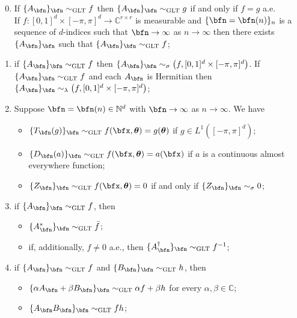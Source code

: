 \documentclass{amsart}
\newcommand{\bftheta}{{\boldsymbol\theta}}
\begin{document}
\begin{enumerate}[label=\textbf{GLT \arabic*}]
\setcounter{enumi}{-1}
\item \label{GLT0} If $\{A_\bfn\}_{\bfn} \sim_{\text{GLT}} f$ then $\{A_\bfn\}_\bfn \sim_{\text{GLT}} g$ if and only if $f=g$ a.e.\\
If $f:[0,1]^d \times[-\pi,\pi]^d \to \mathbb{C}^{r \times r}$ is measurable and $\{\bfn =\bfn(n)\}_n$ is a sequence of $d$-indices such that $\bfn \to \infty$ as $n \to \infty$ then there exists $\{A_\bfn\}_\bfn$ such that $\{A_\bfn\}_\bfn \sim_{\text{GLT}} f$;
\item \label{GLT1} if $\{A_{\bfn}\}_{\bfn} \sim_{\text{GLT}} f$ then $\{A_{\bfn}\}_{\bfn}\sim_{\sigma} \left(f,[0,1]^{d}\times[-\pi,\pi]^d\right)$. If $\{A_{\bfn}\}_{\bfn} \sim_{\text{GLT}} f$ and each $A_{\bfn}$ is Hermitian then $\{A_{\bfn}\}_{\bfn}\sim_{\lambda} \left(f,[0,1]^{d}\times[-\pi,\pi]^d\right)$;
\item \label{GLT2} Suppose $\bfn=\bfn(n) \in \mathbb{N}^d$ with $\bfn \to \infty$ as $n\to \infty$. We have
\begin{itemize}
    \item $\{ T_{\bfn}(g)\}_{\bfn} \sim_{\text{GLT}} f(\bfx,\bftheta)=g(\bftheta)$ if $g \in L^{1}\left([-\pi,\pi]^d\right)$;
    \item $\{ D_{\bfn}(a)\}_{\bfn} \sim_{\text{GLT}} f(\bfx,\bftheta)=a(\bfx)$ if $a$ is a continuous almost everywhere function;
    \item $\{ Z_{\bfn}\}_{\bfn} \sim_{\text{GLT}} f(\bfx,\bftheta)=0$ if and only if $\{ Z_{\bfn}\}_{\bfn} \sim_{\sigma} 0$;
    \end{itemize}
    \item \label{GLT3}  if $\{A_{\bfn}\}_{\bfn}\sim_{\text{GLT}} f$, then
    \begin{itemize}
        \item $\{A^{*}_{\bfn}\}_{\bfn} \sim_{\text{GLT}} \bar{f}$;
        \item if, additionally, $f\neq 0$ a.e., then $\{A^{\dagger}_{\bfn}\}_{\bfn}\sim_{\text{GLT}} f^{-1}$;
    \end{itemize}
    \item \label{GLT4} if $\{A_{\bfn}\}_{\bfn}\sim_{\text{GLT}} f$ and $\{B_{\bfn}\}_{\bfn}\sim_{\text{GLT}} h$, then
    \begin{itemize}
        \item $\{\alpha A_{\bfn}+\beta B_{\bfn}\}_{\bfn}  \sim_{\text{GLT}} \alpha f+\beta h$ for every $\alpha, \beta \in \mathbb{C}$;
        \item $\{A_{\bfn} B_{\bfn}\}_{\bfn}  \sim_{\text{GLT}}  f h$;
    \end{itemize}
    

\end{enumerate}
\end{document}
